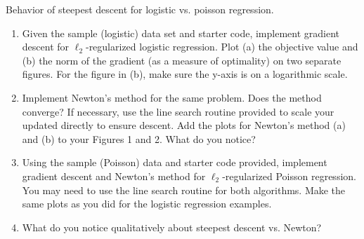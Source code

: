 \documentclass[10pt]{article}
\begin{document}
\begin{problem}[Problem 5]
Behavior of steepest descent for logistic vs. poisson regression. 
\begin{enumerate}[label=(\alph*)]
\item Given the sample (logistic) data set and starter code, implement gradient descent for \( \ell_2 \)-regularized logistic regression. 
Plot (a) the objective value and (b) the norm of the gradient 
(as a measure of optimality) on two separate figures. For the figure in (b), make sure the y-axis is on a logarithmic scale. 
\item Implement Newton's method for the same problem. Does the method converge? If necessary, use the line search routine provided
to scale your updated directly to ensure descent. Add the plots for Newton's method (a) and (b) to your Figures 1 and 2. What do you notice? 
\item Using the sample (Poisson) data  and starter code provided, implement gradient descent and Newton's method for \( \ell_2 \)-regularized Poisson regression. You may need to use the line search routine for 
both algorithms. Make the same plots as you did for the logistic regression examples. 
\item What do you notice qualitatively about steepest descent vs. Newton? 
\end{enumerate}
\end{problem}
\end{document}
